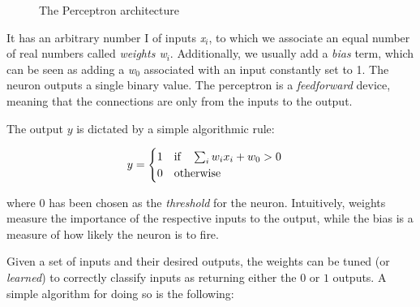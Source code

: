 \begin{figure}
    \centering
    
    
    \caption[The Perceptron]{The Perceptron architecture}
    \label{fig:rosper}
\end{figure}

It has an arbitrary number I of inputs \emph{x$_i$}, to which we associate an equal number of real numbers called \emph{weights w$_i$}. Additionally, we usually add a \emph{bias} term,  which can be seen as adding a \emph{w$_0$} associated with an input constantly set to 1. The neuron outputs a single binary value. The perceptron is a \emph{feedforward} device, meaning that the connections are only from the inputs to the output.

The output $y$ is dictated by a simple algorithmic rule:

\[
\centering
y = 
\begin{cases}
1 \quad \text{if} \quad \sum_i w_ix_i + w_0 > 0 \\
0 \quad \text{otherwise}
\end{cases}
\]

where $0$ has been chosen as the \emph{threshold} for the neuron. 
Intuitively, weights measure the importance of the respective inputs to the output, while the bias is a measure of how likely the neuron is to fire. 

Given a set of inputs and their desired outputs, the weights can be tuned (or \emph{learned}) to correctly classify inputs as returning either the $0$ or $1$ outputs. A simple algorithm for doing so is the following:

